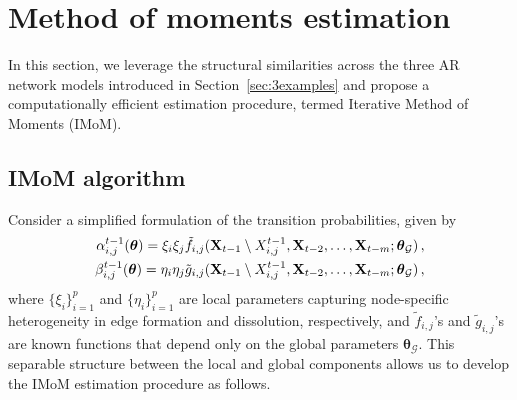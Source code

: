 \documentclass[12pt]{article}
\newcommand{\btheta}{\boldsymbol \theta}
\newcommand{\bX}{{\bf X}}
\newcommand{\0}{{\bf 0}}
\begin{document}
{




 \section{Method of moments estimation} \label{sec:estimation2}

 In this section, we leverage the
 structural similarities across the three AR network models introduced in Section~\ref{sec:3examples} and propose a computationally efficient estimation procedure, termed Iterative Method of Moments (IMoM). 

 \subsection{IMoM algorithm}
 Consider a simplified formulation of the transition probabilities, given by 
\begin{equation}\label{eq:mom:alphaijbetaij}
\begin{split}
 \alpha_{i,j}^{t-1}(\btheta) = \xi_i \xi_j \tilde f_{i,j}(\bX_{t-1}\setminus X_{i,j}^{t-1}, \bX_{t-2}, \ldots, \bX_{t-m}; \btheta_{\mathcal{G}}) \,,\\
    \beta_{i,j}^{t-1}(\btheta) =  \eta_i \eta_j  \tilde g_{i,j}(\bX_{t-1}\setminus X_{i,j}^{t-1}, \bX_{t-2}, \ldots, \bX_{t-m}; \btheta_{\mathcal{G}})\,,
\end{split}
\end{equation}
where $\{\xi_i\}_{i=1}^p$ and $\{\eta_i\}_{i=1}^p$ are local parameters capturing node-specific heterogeneity in edge formation and dissolution, respectively,  and $\tilde f_{i,j}$'s and $\tilde g_{i,j}$'s are known functions that depend only on the global parameters $\btheta_{\mathcal{G}}$. This separable structure between the local and global components allows us to develop the IMoM estimation procedure as follows.


}
\end{document}
